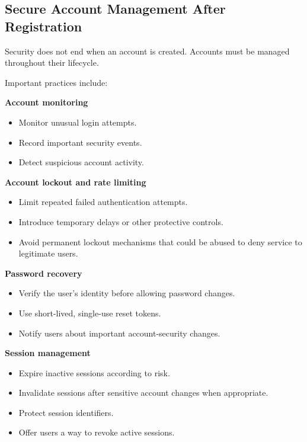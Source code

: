 \subsection{Secure Account Management After Registration}

Security does not end when an account is created. Accounts must be managed throughout their lifecycle.

Important practices include:

\textbf{Account monitoring}

\begin{itemize}
\item Monitor unusual login attempts.
\item Record important security events.
\item Detect suspicious account activity.
\end{itemize}

\textbf{Account lockout and rate limiting}

\begin{itemize}
\item Limit repeated failed authentication attempts.
\item Introduce temporary delays or other protective controls.
\item Avoid permanent lockout mechanisms that could be abused to deny service to legitimate users.
\end{itemize}

\textbf{Password recovery}

\begin{itemize}
\item Verify the user's identity before allowing password changes.
\item Use short-lived, single-use reset tokens.
\item Notify users about important account-security changes.
\end{itemize}

\textbf{Session management}

\begin{itemize}
\item Expire inactive sessions according to risk.
\item Invalidate sessions after sensitive account changes when appropriate.
\item Protect session identifiers.
\item Offer users a way to revoke active sessions.
\end{itemize}

